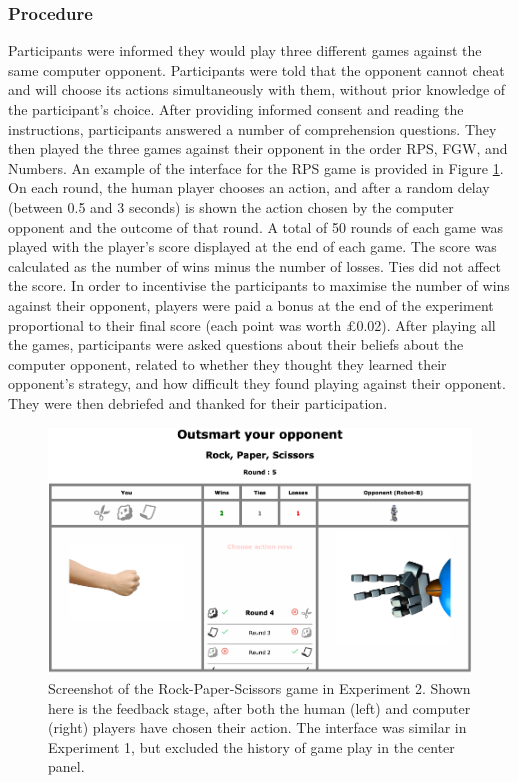 \documentclass[smallextended]{svjour3}       %
\begin{document}
\hypertarget{procedure}{%
\subsubsection{Procedure}\label{procedure}}

Participants were informed they would play three different games against
the same computer opponent. Participants were told that the opponent
cannot cheat and will choose its actions simultaneously with them,
without prior knowledge of the participant's choice. After providing
informed consent and reading the instructions, participants answered a
number of comprehension questions. They then played the three games
against their opponent in the order RPS, FGW, and Numbers. An example of
the interface for the RPS game is provided in Figure
\ref{fig:feedback-rps-exp2}. On each round, the human player chooses an
action, and after a random delay (between 0.5 and 3 seconds) is shown
the action chosen by the computer opponent and the outcome of that
round. A total of 50 rounds of each game was played with the player's
score displayed at the end of each game. The score was calculated as the
number of wins minus the number of losses. Ties did not affect the
score. In order to incentivise the participants to maximise the number
of wins against their opponent, players were paid a bonus at the end of
the experiment proportional to their final score (each point was worth
£0.02). After playing all the games, participants were asked questions
about their beliefs about the computer opponent, related to whether they
thought they learned their opponent's strategy, and how difficult they
found playing against their opponent. They were then debriefed and
thanked for their participation.

\begin{figure}

{\centering \includegraphics[width=\textwidth]{../images/feedback_rps} 

}

\caption{Screenshot of the Rock-Paper-Scissors game in Experiment 2. Shown here is the feedback stage, after both the human (left) and computer (right) players have chosen their action. The interface was similar in Experiment 1, but excluded the history of game play in the center panel.}\label{fig:feedback-rps-exp2}
\end{figure}
\end{document}
